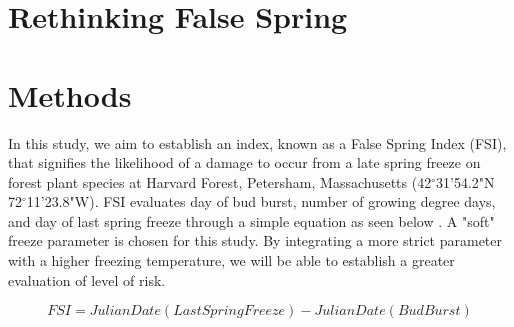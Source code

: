 \documentclass{article}\usepackage[]{graphicx}\usepackage[]{color}
\begin{document}
\section*{Rethinking False Spring}

\section*{Methods}

In this study, we aim to establish an index, known as a False Spring Index (FSI), that signifies the likelihood of a damage to occur from a late spring freeze on forest plant species at Harvard Forest, Petersham, Massachusetts (42$^{\circ}$31'54.2"N 72$^{\circ}$11'23.8"W). FSI evaluates day of bud burst, number of growing degree days, and day of last spring freeze through a simple equation as seen below \cite{Marino2011}. A "soft" freeze parameter is chosen for this study. By integrating a more strict parameter with a higher freezing temperature, we will be able to establish a greater evaluation of level of risk. 

\[ FSI = Julian Date (Last Spring Freeze) - Julian Date (Bud Burst) \]
\end{document}
